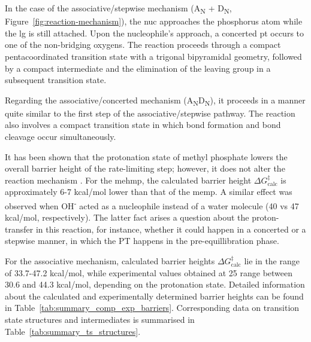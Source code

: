 In the case of the associative/stepwise mechanism (A\textsubscript{N} + D\textsubscript{N}, Figure~\ref{fig:reaction-mechanism}), the \ac{nuc} approaches the phosphorus atom while the \ac{lg} is still attached. Upon the nucleophile's approach, a concerted \ac{pt} occurs to one of the non-bridging oxygens. The reaction proceeds through a compact pentacoordinated transition state with a trigonal bipyramidal geometry, followed by a compact intermediate and the elimination of the leaving group in a subsequent transition state.

Regarding the associative/concerted mechanism (A\textsubscript{N}D\textsubscript{N}), it proceeds in a manner quite similar to the first step of the associative/stepwise pathway. The reaction also involves a compact transition state in which bond formation and bond cleavage occur simultaneously.

It has been shown that the protonation state of methyl phosphate lowers the overall barrier height of the rate-limiting step; however, it does not alter the reaction mechanism \citep{hassanEffectProtonationMechanism2017}. For the \ac{mehmp}, the calculated barrier height $\Delta G^{\ddagger}_{\text{calc}}$ is approximately 6-7 kcal/mol lower than that of the \ac{memp}. A similar effect was observed when OH\textsuperscript{-} acted as a nucleophile instead of a water molecule \citep{klahnMechanismHydrolysisPhosphate2006} (40 vs 47 kcal/mol, respectively). The latter fact arises a question about the proton-transfer in this reaction, for instance, whether it could happen in a concerted or a stepwise manner, in which the PT happens in the pre-equillibration phase.

For the associative mechanism, calculated barrier heights $\Delta G^{\ddagger}_{\text{calc}}$ lie in the range of 33.7-47.2 kcal/mol, while experimental values obtained at 25  range between 30.6 and 44.3 kcal/mol, depending on the protonation state. Detailed information about the calculated and experimentally determined barrier heights can be found in Table~\ref{tab:summary_comp_exp_barriers}. Corresponding data on transition state structures and intermediates is summarised in Table~\ref{tab:summary_ts_structures}.

